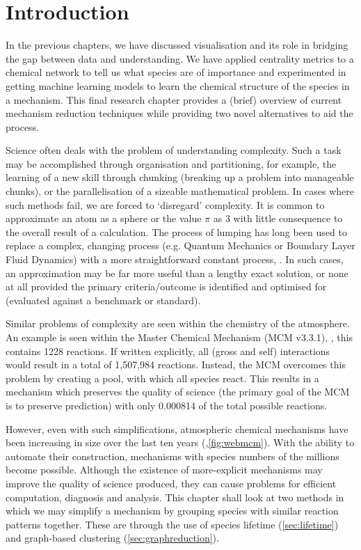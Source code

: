 

\section{Introduction}

In the previous chapters, we have discussed visualisation and its role in bridging the gap between data and understanding. We have applied centrality metrics to a chemical network to tell us what species are of importance and experimented in getting machine learning models to learn the chemical structure of the species in a mechanism. This final research chapter provides a (brief) overview of current mechanism reduction techniques while providing two novel alternatives to aid the process.

Science often deals with the problem of understanding complexity. Such a task may be accomplished through organisation and partitioning, for example, the learning of a new skill through chunking (breaking up a problem into manageable chunks), or the parallelisation of a sizeable mathematical problem. In cases where such methods fail, we are forced to `disregard' complexity. It is common to approximate an atom as a sphere or the value $\pi$ as 3 with little consequence to the overall result of a calculation. The process of lumping has long been used to replace a complex, changing process (e.g. Quantum Mechanics or Boundary Layer Fluid Dynamics) with a more straightforward constant process, \citep{approx}. In such cases, an approximation may be far more useful than a lengthy exact solution, or none at all provided the primary criteria/outcome is identified and optimised for (evaluated against a benchmark or standard).

Similar problems of complexity are seen within the chemistry of the atmosphere. An example is seen within the Master Chemical Mechanism (MCM v3.3.1), \citep{mcm}, this contains 1228  reactions. If written explicitly, all  (gross and self) interactions would result in a total of 1,507,984 reactions. Instead, the MCM overcomes this problem by creating a  pool, with which all  species react. This results in a mechanism which preserves the quality of science (the primary goal of the MCM is to preserve  prediction) with only 0.000814 of the total possible  reactions.

However, even with such simplifications, atmospheric chemical mechanisms have been increasing in size over the last ten years (\citep{defra1},\autoref{fig:webmcm}). With the ability to automate their construction, mechanisms with species numbers of the millions become possible. Although the existence of more-explicit mechanisms may improve the quality of science produced, they can cause problems for efficient computation, diagnosis and analysis. This chapter shall look at two methods in which we may simplify a mechanism by grouping species with similar reaction patterns together. These are through the use of species lifetime (\autoref{sec:lifetime}) and graph-based clustering (\autoref{sec:graphreduction}).




